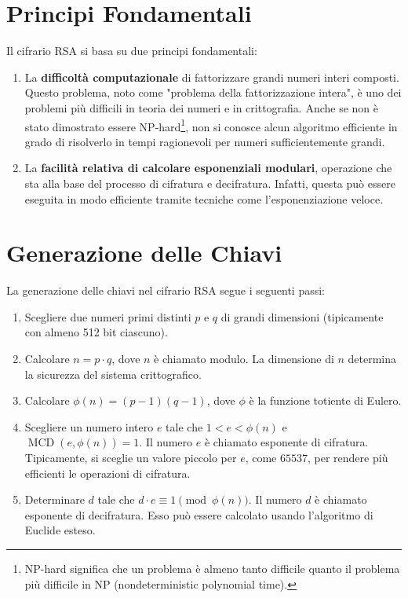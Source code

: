 \documentclass[a4paper,12pt]{report}
\begin{document}
\section{Principi Fondamentali}
Il cifrario RSA si basa su due principi fondamentali:

\begin{enumerate}
    \item La \textbf{difficoltà computazionale} di fattorizzare grandi numeri interi composti. Questo problema, noto come "problema della fattorizzazione intera", è uno dei problemi più difficili in teoria dei numeri e in crittografia. Anche se non è stato dimostrato essere NP-hard\footnote[1]{NP-hard significa che un problema è almeno tanto difficile quanto il problema più difficile in NP (nondeterministic polynomial time).}, non si conosce alcun algoritmo efficiente in grado di risolverlo in tempi ragionevoli per numeri sufficientemente grandi.
    \item La \textbf{facilità relativa di calcolare esponenziali modulari}, operazione che sta alla base del processo di cifratura e decifratura. Infatti, questa può essere eseguita in modo efficiente tramite tecniche come l'esponenziazione veloce.
\end{enumerate}

\section{Generazione delle Chiavi}
La generazione delle chiavi nel cifrario RSA segue i seguenti passi:

\begin{enumerate}
    \item Scegliere due numeri primi distinti $p$ e $q$ di grandi dimensioni (tipicamente con almeno 512 bit ciascuno).
    \item Calcolare $n = p \cdot q$, dove $n$ è chiamato modulo. La dimensione di $n$ determina la sicurezza del sistema crittografico.
    \item Calcolare $\phi(n) = (p - 1)(q - 1)$, dove $\phi$ è la funzione totiente di Eulero.
    \item Scegliere un numero intero $e$ tale che $1 < e < \phi(n)$ e $\operatorname{MCD}(e, \phi(n)) = 1$. Il numero $e$ è chiamato esponente di cifratura. Tipicamente, si sceglie un valore piccolo per $e$, come $65537$, per rendere più efficienti le operazioni di cifratura.
    \item Determinare $d$ tale che $d \cdot e \equiv 1 \pmod{\phi(n)}$. Il numero $d$ è chiamato esponente di decifratura. Esso può essere calcolato usando l'algoritmo di Euclide esteso.
\end{enumerate}
\end{document}
